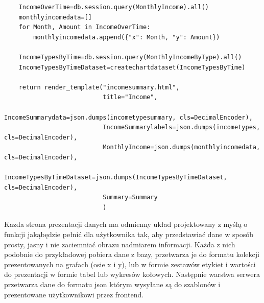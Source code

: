 \documentclass[a4paper,10pt, twoside]{report}
\begin{document}
\begin{large}
\begin{minipage}{\textwidth}
\begin{lstlisting}
    IncomeOverTime=db.session.query(MonthlyIncome).all()
    monthlyincomedata=[]
    for Month, Amount in IncomeOverTime:
        monthlyincomedata.append({"x": Month, "y": Amount})

    IncomeTypesByTime=db.session.query(MonthlyIncomeByType).all()
    IncomeTypesByTimeDataset=createchartdataset(IncomeTypesByTime)

    return render_template("incomesummary.html",
                           title="Income",
                           IncomeSummarydata=json.dumps(incometypesummary, cls=DecimalEncoder),
                           IncomeSummarylabels=json.dumps(incometypes, cls=DecimalEncoder),
                           MonthlyIncome=json.dumps(monthlyincomedata, cls=DecimalEncoder),
                           IncomeTypesByTimeDataset=json.dumps(IncomeTypesByTimeDataset, cls=DecimalEncoder),
                           Summary=Summary
                           )\end{lstlisting}
{Kazda strona prezentacji danych ma odmienny układ projektowany z myślą o 
funkcji jakąbędzie pełnić dla użytkownika tak, aby przedstawiać dane w sposób 
prosty, jasny i nie zaciemniać obrazu nadmiarem informacji. Każda z nich 
podobnie do przykładowej pobiera dane z bazy, przetwarza je do formatu kolekcji 
prezentowanych na grafach (osie x i y), lub w formie zestawów etykiet i wartości
 do prezentacji w formie tabel lub wykresów kołowych. Następnie warstwa 
serwera przetwarza dane do formatu json \cite{JSON} którym wysyłane są do 
szablonów i prezentowane użytkownikowi przez frontend.}
\end{minipage}


\end{large}
\end{document}
